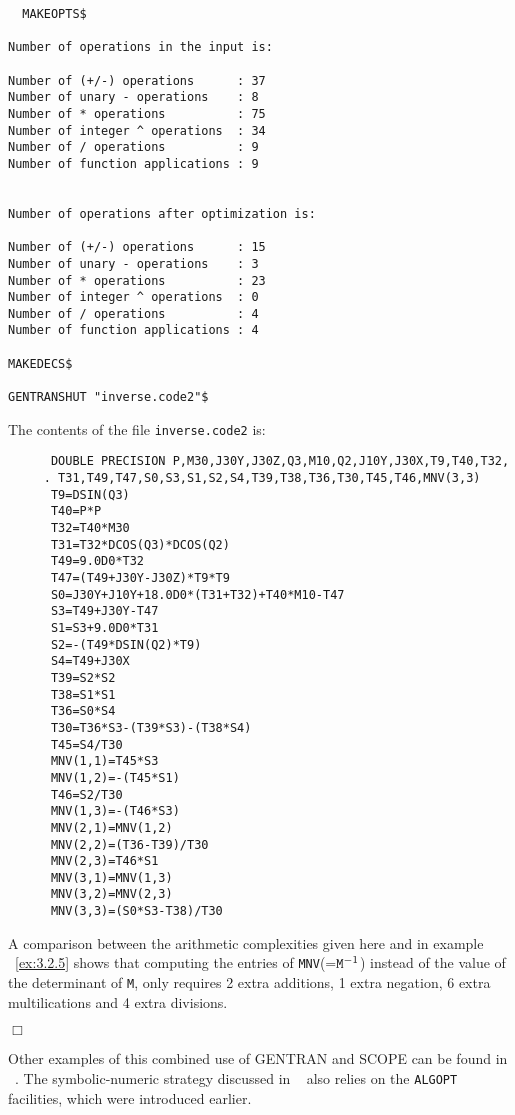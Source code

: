 {{\begin{verbatim}
  MAKEOPTS$

Number of operations in the input is: 

Number of (+/-) operations      : 37
Number of unary - operations    : 8
Number of * operations          : 75
Number of integer ^ operations  : 34
Number of / operations          : 9
Number of function applications : 9


Number of operations after optimization is:

Number of (+/-) operations      : 15
Number of unary - operations    : 3
Number of * operations          : 23
Number of integer ^ operations  : 0
Number of / operations          : 4
Number of function applications : 4

MAKEDECS$

GENTRANSHUT "inverse.code2"$
\end{verbatim}}

The contents of the file {\tt inverse.code2} is:
{\small
\begin{verbatim}
      DOUBLE PRECISION P,M30,J30Y,J30Z,Q3,M10,Q2,J10Y,J30X,T9,T40,T32,
     . T31,T49,T47,S0,S3,S1,S2,S4,T39,T38,T36,T30,T45,T46,MNV(3,3)
      T9=DSIN(Q3)
      T40=P*P
      T32=T40*M30
      T31=T32*DCOS(Q3)*DCOS(Q2)
      T49=9.0D0*T32
      T47=(T49+J30Y-J30Z)*T9*T9
      S0=J30Y+J10Y+18.0D0*(T31+T32)+T40*M10-T47
      S3=T49+J30Y-T47
      S1=S3+9.0D0*T31
      S2=-(T49*DSIN(Q2)*T9)
      S4=T49+J30X
      T39=S2*S2
      T38=S1*S1
      T36=S0*S4
      T30=T36*S3-(T39*S3)-(T38*S4)
      T45=S4/T30
      MNV(1,1)=T45*S3
      MNV(1,2)=-(T45*S1)
      T46=S2/T30
      MNV(1,3)=-(T46*S3)
      MNV(2,1)=MNV(1,2)
      MNV(2,2)=(T36-T39)/T30
      MNV(2,3)=T46*S1
      MNV(3,1)=MNV(1,3)
      MNV(3,2)=MNV(2,3)
      MNV(3,3)=(S0*S3-T38)/T30
\end{verbatim}}

A comparison between the arithmetic complexities given here and in example
~\ref{ex:3.2.5} shows that computing the entries of {\tt MNV}(=${\tt M}^{-1}$) 
instead of the value of the determinant of {\tt M}, only requires 2 
extra additions, 1 extra negation, 6 extra multilications and 4 extra 
divisions. 
{\small
\begin{flushright}
$\Box$
\end{flushright}}

Other examples of this combined use of GENTRAN and SCOPE can be found 
in ~\cite{vanHulzen:95,Ganzha:94}. The symbolic-numeric strategy discussed in
~\cite{Ganzha:94} also relies on the {\tt ALGOPT} facilities, which were 
introduced earlier. 
\newpage
}
